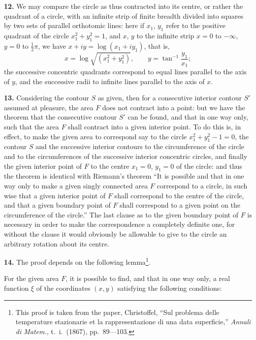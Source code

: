 \documentclass[11pt,a4paper]{article}
\begin{document}
\textbf{12.} We may compare the circle as thus contracted into its centre, or rather the quadrant of a circle, with an infinite strip of finite breadth divided into squares by two sets of parallel orthotomic lines: here if $x_1$, $y_1$ refer to the positive quadrant of the circle $x_1^2 + y_1^2 = 1$, and $x$, $y$ to the infinite strip $x = 0$ to $-\infty$, $y = 0$ to $\tfrac{1}{2}\pi$, we have $x + iy = \log(x_1 + iy_1)$, that is,
\[
x = \log \sqrt{(x_1^2 + y_1^2)}, \qquad y = \tan^{-1}\frac{y_1}{x_1};
\]
the successive concentric quadrants correspond to equal lines parallel to the axis of $y$, and the successive radii to infinite lines parallel to the axis of $x$.

\textbf{13.} Considering the contour $S$ as given, then for a consecutive interior contour $S'$ assumed at pleasure, the area $F$ does not contract into a point: but we have the theorem that the consecutive contour $S'$ can be found, and that in one way only, such that the area $F$ shall contract into a given interior point. To do this is, in effect, to make the given area to correspond say to the circle $x_1^2 + y_1^2 - 1 = 0$, the contour $S$ and the successive interior contours to the circumference of the circle and to the circumferences of the successive interior concentric circles, and finally the given interior point of $F$ to the centre $x_1 = 0$, $y_1 = 0$ of the circle: and thus the theorem is identical with Riemann's theorem ``It is possible and that in one way only to make a given singly connected area $F$ correspond to a circle, in such wise that a given interior point of $F$ shall correspond to the centre of the circle, and that a given boundary point of $F$ shall correspond to a given point on the circumference of the circle.'' The last clause as to the given boundary point of $F$ is necessary in order to make the correspondence a completely definite one, for without the clause it would obviously be allowable to give to the circle an arbitrary rotation about its centre.

\textbf{14.} The proof depends on the following lemma\footnote{This proof is taken from the paper, Christoffel, ``Sul problema delle temperature stazionarie et la rappresentazione di una data superficie,'' \textit{Annali di Matem.}, t.~i.\ (1867), pp.\ 89---103.}.

For the given area $F$, it is possible to find, and that in one way only, a real function $\xi$ of the coordinates $(x, y)$ satisfying the following conditions:
\end{document}
